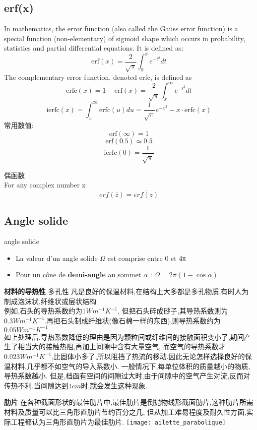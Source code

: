 \subsection{erf(x)}
In mathematics, the error function (also called the Gauss error function) is a special function (non-elementary) of sigmoid shape which occurs in probability, statistics and partial differential equations. It is defined as:
\begin{equation}
 \mbox{erf}(x)=\frac{2}{\sqrt{\pi}}\int_{0}^{x}e^{-t^2}dt
\end{equation}
The complementary error function, denoted erfc, is defined as
\begin{equation}
 \mbox{erfc}(x)=1-\mbox{erf}(x)=\frac{2}{\sqrt{\pi}}\int_{x}^{\infty }e^{-t^2}dt
\end{equation}
$$\mbox{ierfc}(x)=\int_x^{\infty}\mbox{erfc}(u)du=\frac{ 1}{\sqrt{\pi}}e^{-x^2} -  x \cdot \mbox{erfc}(x)$$
常用数值:
$$\mbox{erf}(\infty)=1$$
$$\mbox{erf}(0.5) \simeq 0.5$$
$$\mbox{ierfc}(0)=\frac{ 1}{\sqrt{\pi}}$$

偶函数\\
For any complex number z:
\begin{equation}
 erf(\overline{z})=\overline{erf(z)}
\end{equation}

\subsection{Angle solide}
angle solide
\begin{itemize}
\item La valeur d’un angle solide $\Omega$ est comprise entre 0 et 4π
\item Pour un c\^one de \textbf{demi-angle} au sommet $\alpha$ : $\Omega = 2\pi(1- \cos \alpha)$
\end{itemize}

\textbf{材料的导热性}
多孔性 凡是良好的保温材料,在结构上大多都是多孔物质,有时人为制成泡沫状,纤维状或层状结构 \\
例如,石头的导热系数约为$1Wm^{-1}K^{-1}$, 但把石头碎成砂子,其导热系数则为$0.3Wm^{-1}K^{-1}$.再把石头制成纤维状(像石棉一样的东西),则导热系数约为$0.05Wm^{-1}K^{-1}$ \\
如上处理后,导热系数降低的理由是因为颗粒间或纤维间的接触面积变小了,期间产生了相当大的接触热阻,再加上间隙中含有大量空气,
而空气的导热系数才$0.023Wm^{-1}K^{-1}$,比固体小多了,所以阻挡了热流的移动.因此无论怎样选择良好的保温材料,几乎都不如空气的导入系数小.
一般情况下,每单位体积的质量越小的物质,导热系数越小. 但是,档函有空间的间隙过大时,由于间隙中的空气产生对流,反而对传热不利.当间隙达到$1cm$时,就会发生这种现象.

\textbf{肋片}
在各种截面形状的最佳肋片中,最佳肋片是倒抛物线形截面肋片,这种肋片所需材料及质量可以比三角形直肋片节约百分之几,
但从加工难易程度及耐久性方面,实际工程都认为三角形直肋片为最佳肋片.
\texttt{[image: ailette\_parabolique]}\\

